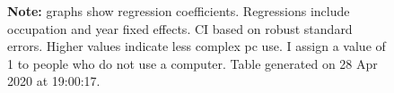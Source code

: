 \begin{figure}[!h]
\par \begin{minipage}[h]{\textwidth}{\scriptsize\textbf{Note:} graphs show regression coefficients. Regressions include occupation and year fixed effects. CI based on robust standard errors. Higher values indicate less complex pc use. I assign a value of 1 to people who do not use a computer. Table generated on 28 Apr 2020 at 19:00:17.}\end{minipage}
\end{figure}
